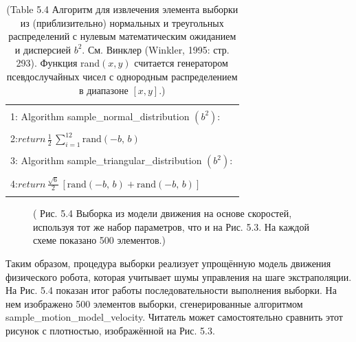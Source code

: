 \documentclass[10pt,a4paper]{article}
\begin{document}
\begin{table}[H]
\begin{center}
\begin{tabular}{|l|}
\hline
{}\\
1: \hspace{3mm} Algorithm sample\_normal\_distribution $(b^2):$ \\
{}\\
2:\hspace{7mm}$\textit{return}\,\frac{1}{2}\,\sum_{i=1}^{12}\text{rand}(-b,\,b)$\\
{}\\
3:\hspace{3mm} Algorithm sample\_triangular\_distribution $(b^2):$ \\
{}\\
4:\hspace{7mm}$\textit{return}\,\frac{\sqrt{6}}{2}\,[\text{rand}(-b,\,b)+\text{rand}(-b,\,b)]$\\ 
{}\\
\hline
\end{tabular}
\caption{(Table 5.4 Алгоритм для извлечения элемента выборки из (приблизительно) нормальных и треугольных распределений с нулевым математическим ожиданием и дисперсией $b^2$. См. Винклер (Winkler, 1995: стр. 293). Функция rand$(x, y)$ считается генератором псевдослучайных чисел с однородным распределением в диапазоне $[x, y]$.)}
\end{center}
\end{table}

\begin{figure}[H]
	\caption{ (  Рис. 5.4 Выборка из модели движения на основе скоростей, используя тот же набор параметров, что и на Рис. 5.3. На каждой схеме показано 500 элементов.)}
	\label{fig:54orig}
\end{figure}

Таким образом, процедура выборки реализует упрощённую модель движения физического робота, которая учитывает шумы управления на шаге экстраполяции. На Рис. 5.4 показан итог работы последовательности выполнения выборки. На нем изображено 500 элементов выборки, сгенерированные алгоритмом sample\_motion\_model\_velocity. Читатель может самостоятельно сравнить этот рисунок с плотностью, изображённой на Рис. 5.3.
\end{document}
